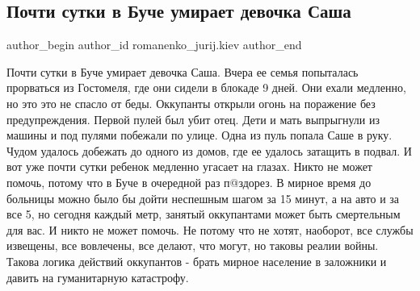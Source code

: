  
 
 
 
 
 
\subsection{Почти сутки в Буче умирает девочка Саша}
\label{sec:05_03_2022.fb.romanenko_jurij.kiev.1.bucha_devochka_sasha}
 
\ifcmt
 author_begin
   author_id romanenko_jurij.kiev
 author_end
\fi


Почти сутки в Буче умирает девочка Саша. Вчера ее семья попыталась прорваться
из Гостомеля, где они сидели в блокаде 9 дней. Они ехали медленно, но это это
не спасло от беды. Оккупанты открыли огонь на поражение без предупреждения.
Первой пулей был убит отец. Дети и мать выпрыгнули из машины и под пулями
побежали по улице. Одна из пуль попала Саше в руку. Чудом удалось добежать до
одного из домов, где ее удалось затащить в подвал. И вот уже почти сутки
ребенок медленно угасает на глазах. Никто не может помочь, потому что в Буче в
очередной раз п@здорез. В мирное время до больницы можно было бы дойти
неспешным шагом за 15 минут, а на авто и за все 5, но сегодня каждый метр,
занятый оккупантами может быть смертельным для вас. И никто не может помочь. Не
потому что не хотят, наоборот, все службы извещены, все вовлечены, все делают,
что могут, но таковы реалии войны. Такова логика действий оккупантов - брать
мирное население в заложники и давить на гуманитарную катастрофу.
